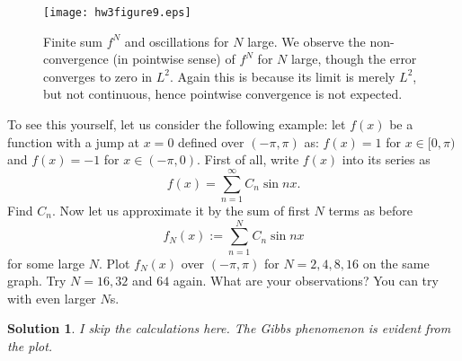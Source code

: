 \documentclass[6pt]{article}
\newtheorem{solution}{Solution}
\numberwithin{equation}{section}
\begin{document}
\begin{enumerate}
  \begin{figure}[h]\vspace{-8mm}
  \centering
\texttt{[image: hw3figure9.eps]}
\caption{Finite sum $f^N$ and oscillations for $N$ large.  We observe the non-convergence (in pointwise sense) of $f^N$ for $N$ large, though the error converges to zero in $L^2$.  Again this is because its limit is merely $L^2$, but not continuous, hence pointwise convergence is not expected.}
\end{figure}
  To see this yourself, let us consider the following example: let $f(x)$ be a function with a jump at $x=0$ defined over $(-\pi,\pi)$ as: $f(x)=1$ for $x\in[0,\pi)$ and $f(x)=-1$ for $x\in(-\pi,0)$.  First of all, write $f(x)$ into its series as
    \[f(x)=\sum_{n=1}^\infty C_n\sin nx.\]
    Find $C_n$.  Now let us approximate it by the sum of first $N$ terms as before
    \[f_N(x):=\sum_{n=1}^N C_n\sin nx\]
    for some large $N$.  Plot $f_N(x)$ over $(-\pi,\pi)$ for $N=2,4,8,16$ on the same graph.  Try $N=16,32$ and $64$ again.  What are your observations?  You can try with even larger $N$s.

\begin{solution}
I skip the calculations here.  The Gibbs phenomenon is evident from the plot.
\end{solution}


\end{enumerate}
\end{document}
